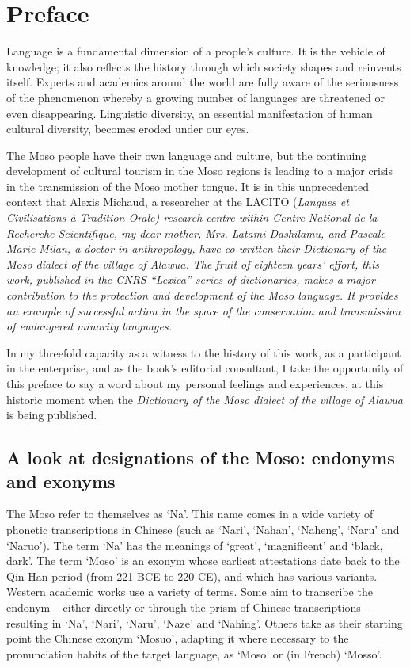 \languefra

\chapter*{Preface}

Language is a fundamental dimension of a people's culture. It is the vehicle of knowledge; it also reflects the history through which society shapes and reinvents itself. Experts and academics around the world are fully aware of the seriousness of the phenomenon whereby a growing number of languages are threatened or even disappearing. Linguistic diversity, an essential manifestation of human cultural diversity, becomes eroded under our eyes.

The Moso people have their own language and culture, but the continuing development of cultural tourism in the Moso regions is leading to a major crisis in the transmission of the Moso mother tongue. It is in this unprecedented context that Alexis Michaud, a researcher at the LACITO (\em{Langues et Civilisations à Tradition Orale}) research centre within \emph{Centre National de la Recherche Scientifique}, my dear mother, Mrs. Latami Dashilamu, and Pascale-Marie Milan, a doctor in anthropology, have co-written their \emph{Dictionary of the Moso dialect of the village of Alawua}. The fruit of eighteen years' effort, this work, published in the CNRS “Lexica” series of dictionaries, makes a major contribution to the protection and development of the Moso language. It provides an example of successful action in the space of the conservation and transmission of endangered minority languages.

In my threefold capacity as a witness to the history of this work, as a participant in the enterprise, and as the book's editorial consultant, I take the opportunity of this preface to say a word about my personal feelings and experiences, at this historic moment when the \emph{Dictionary of the Moso dialect of the village of Alawua} is being published.

\section*{A look at designations of the Moso: endonyms and exonyms}

The Moso refer to themselves as ‘Na’. This name comes in a wide variety of phonetic transcriptions in Chinese (such as ‘Nari’, ‘Nahan’, ‘Naheng’, ‘Naru’ and ‘Naruo’). The term ‘Na’ has the meanings of ‘great’, ‘magnificent’ and ‘black, dark’. The term ‘Moso’ is an exonym whose earliest attestations date back to the Qin-Han period (from 221 BCE to 220 CE), and which has various variants. Western academic works use a variety of terms. Some aim to transcribe the endonym -- either directly or through the prism of Chinese transcriptions -- resulting in ‘Na’, ‘Nari’, ‘Naru’, ‘Naze’ and ‘Nahing’. Others take as their starting point the Chinese exonym  ‘Mosuo’, adapting it where necessary to the pronunciation habits of the target language, as ‘Moso’ or (in French) ‘Mosso’.

